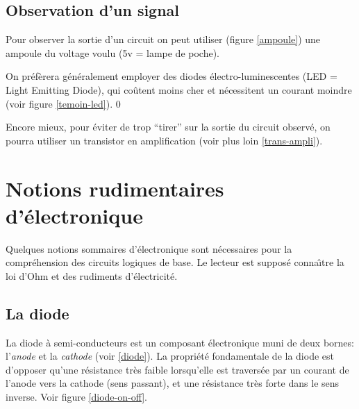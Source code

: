 \subsection{Observation d'un signal}

Pour observer la sortie d'un circuit on peut utiliser (figure \ref{ampoule})
une ampoule du voltage
voulu (5v = lampe de poche). 



On préfèrera généralement employer des 
diodes \'electro-luminescentes (LED = Light Emitting Diode),
qui coûtent moins cher et n\'ecessitent un courant moindre 
(voir figure \ref{temoin-led}).
0


Encore mieux, pour \'eviter de trop ``tirer'' sur la sortie du circuit
observ\'e, on pourra utiliser un transistor en amplification
(voir plus loin \ref{trans-ampli}).





\section{Notions rudimentaires d'\'electronique}

Quelques notions sommaires d'\'electronique sont n\'ecessaires pour la 
compr\'ehension des circuits logiques de base. Le lecteur est suppos\'e
conna\^{\i}tre la loi d'Ohm et des rudiments d'\'electricit\'e.

\subsection{La diode}

La diode \`a semi-conducteurs est un composant \'electronique muni de deux
bornes: l'{\em anode} et la {\em cathode} (voir \ref{diode}). 
La propri\'et\'e fondamentale de
la diode est d'opposer qu'une r\'esistance tr\`es faible lorsqu'elle est 
travers\'ee par un courant de l'anode vers la cathode (sens passant), et une résistance très forte dans le sens inverse.
Voir figure \ref{diode-on-off}.


